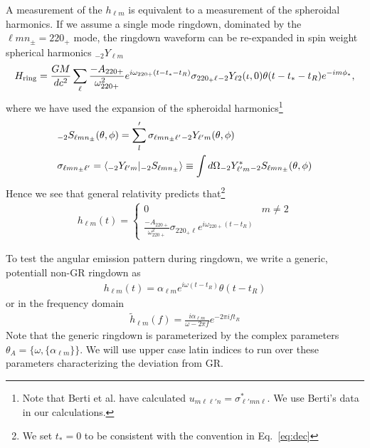 \documentclass[aps,prd,amsmath,showpacs,amssymb,superscriptaddress,nofootinbib,longbibliography,eqsecnum,preprintnumbers]{revtex4-1}
\newcommand{\Sph}{{}_{-2}S_{\ell m n_{\pm}}}
\newcommand{\Ys}{{}_{-2}Y_{\ell m}}
\newcommand{\mul}{{\ell m n_{\pm}}}
\begin{document}
A measurement of the $h_{\ell m}$ is equivalent to a measurement of the spheroidal harmonics.
If we assume a single mode ringdown, dominated by the $\mul=220_+$ mode, the ringdown waveform can be re-expanded in spin weight spherical harmonics $\Ys$
\begin{align}
H_{\rm ring}=\frac{GM}{dc^2}\sum_{\ell}\frac{-A_{220+}}{\omega_{220+}^2}e^{i\omega_{220+}(t-t_*-t_R)}\sigma_{220_+\ell }{}_{-2}Y_{\ell 2}(\iota,0) \theta(t-t_*-t_R)e^{-im\phi_*},
\end{align}
where we have used the expansion of the spheroidal harmonics\footnote{Note that Berti et al. \cite{Berti:2014fga} have calculated $u_{m\ell \ell'n}=\sigma_{\ell'mn\ell}^*$. We use Berti's data in our calculations.}
\begin{align}
&\Sph(\theta, \phi)=\sum_l'\sigma_{\ell m n_{\pm} \ell'}{}_{-2}Y_{\ell'm}(\theta,\phi) \nonumber \\
&\sigma_{\ell m n_\pm \ell'}=\braket{{}_{-2}Y_{\ell' m}|\Sph}\equiv \int d\Omega {}_{-2}Y^*_{\ell ' m}\Sph(\theta,\phi)
\end{align}
Hence we see that general relativity predicts that\footnote{We set $t_*=0$ to be consistent with the convention in Eq.~\eqref{eq:dec}} 
\begin{align}
h_{\ell m}(t)=
\begin{cases}
0 & m\neq 2 \\
\frac{-A_{220+}}{\omega_{220+}^2} \sigma_{220_+\ell }e^{i\omega_{220+}(t-t_R)}
\end{cases}
\end{align}

To test the angular emission pattern during ringdown, we write a generic, potentiall non-GR ringdown as
\begin{align}
h_{\ell m}(t)=\alpha_{\ell m}e^{i\omega (t-t_R)} \theta(t-t_R) \label{eq:genr}
\end{align}
or in the frequency domain
\begin{align}
\tilde h_{\ell m}(f)=\frac{i\alpha_{\ell m}}{\omega -2\pi f}e^{-2\pi i ft_R}
\end{align}
Note that the generic ringdown is parameterized by the complex parameters ${\theta_A}=\{\omega,\{\alpha_{\ell m}\}\}$. We will use upper case latin indices to run over these parameters characterizing the deviation from GR.
\end{document}
